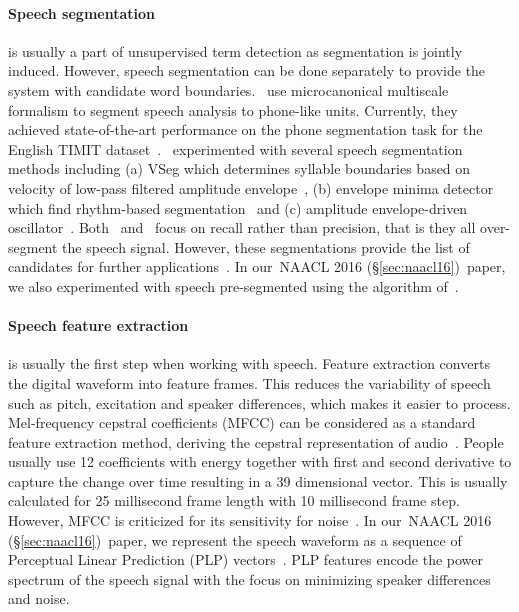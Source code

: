 \documentclass[12pt,twoside,final,hidelinks]{ltthesis}
\theoremstyle{definition}
\newcommand\naaclvi{NAACL 2016 (\S\ref{sec:naacl16})}
\begin{document}
\paragraph{Speech segmentation} is usually a part of unsupervised term detection as segmentation is jointly induced. However, speech segmentation can be done separately to provide the system 
with candidate word boundaries.~ use microcanonical multiscale formalism to segment speech analysis to phone-like 
units. Currently, they achieved state-of-the-art performance on the phone segmentation task for the English TIMIT dataset~\cite{timit}.~ experimented 
with several speech segmentation methods including (a) VSeg which determines syllable boundaries based on velocity of low-pass filtered amplitude envelope~\cite{nuimeprn1268},
(b) envelope minima detector which find rhythm-based segmentation~\cite{villing2006performance} and (c) amplitude envelope-driven 
oscillator~\cite{ghitza2011linking}. Both~ and~ focus on recall rather than precision, that is they all over-segment the speech signal. However, these segmentations provide the list of candidates for further applications~\cite{KamperJG16a}. In our~\naaclvi\ paper, we also experimented with speech pre-segmented using the algorithm of~.

\paragraph{Speech feature extraction} is usually the first step when working with speech. Feature extraction converts the digital waveform into feature frames. 
This reduces the variability of speech such as pitch, excitation and speaker differences, which makes it easier to process. Mel-frequency cepstral coefficients (MFCC) can be 
considered as a standard feature extraction method, deriving the cepstral representation of audio~\cite{Fang:2001:CDI:569577.569587}. People usually use 12 
coefficients with energy together with first and second derivative to capture the change over time resulting in a 39 dimensional vector. This is usually calculated for 
25 millisecond frame length with 10 millisecond frame step. However, MFCC is criticized for its sensitivity for noise~\cite{DBLP:journals/corr/abs-1305-1145}. 
In our~\naaclvi\ paper, we represent the speech waveform as a sequence of Perceptual Linear Prediction (PLP) vectors~\cite{Hermansky90plpspeech}. PLP features encode the 
power spectrum of the speech signal with the focus on minimizing speaker differences and noise. 
\end{document}
